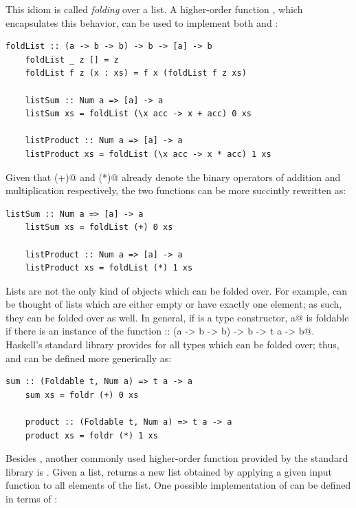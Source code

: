 \documentclass[UdineBachThesis,american,11pt]{PhdThesis}
\begin{document}
  This idiom is called \emph{folding} over a list. A higher-order function
  \lstinline@foldList@, which encapsulates this behavior, can be used to
  implement both \lstinline@listSum@ and \lstinline@listProduct@:

  \begin{lstlisting}[gobble=4,basicstyle=\ttfamily\small]
    foldList :: (a -> b -> b) -> b -> [a] -> b
    foldList _ z [] = z
    foldList f z (x : xs) = f x (foldList f z xs)

    listSum :: Num a => [a] -> a
    listSum xs = foldList (\x acc -> x + acc) 0 xs

    listProduct :: Num a => [a] -> a
    listProduct xs = foldList (\x acc -> x * acc) 1 xs
  \end{lstlisting}

  Given that \lstinline@(+)@ and \lstinline@(*)@ already denote the binary
  operators of addition and multiplication respectively, the two functions can
  be more succintly rewritten as:

  \begin{lstlisting}[gobble=4,basicstyle=\ttfamily\small]
    listSum :: Num a => [a] -> a
    listSum xs = foldList (+) 0 xs

    listProduct :: Num a => [a] -> a
    listProduct xs = foldList (*) 1 xs
  \end{lstlisting}

  Lists are not the only kind of objects which can be folded over. For example,
  \lstinline@Maybe@s can be thought of lists which are either empty or have
  exactly one element; as such, they can be folded over as well. In general, if
  \lstinline@t@ is a type constructor, \lstinline@t a@ is foldable if there is
  an instance of the function
  \lstinline@foldr :: (a -> b -> b) -> b -> t a -> b@. Haskell's standard
  library provides \lstinline@foldr@ for all types which can be folded over;
  thus, \lstinline@listSum@ and \lstinline@listProduct@ can be defined more
  generically as:

  \begin{lstlisting}[gobble=4,basicstyle=\ttfamily\small]
    sum :: (Foldable t, Num a) => t a -> a
    sum xs = foldr (+) 0 xs

    product :: (Foldable t, Num a) => t a -> a
    product xs = foldr (*) 1 xs
  \end{lstlisting}

  \pagebreak

  Besides \lstinline@foldr@, another commonly used higher-order function
  provided by the standard library is \lstinline@map@. Given a list,
  \lstinline@map@ returns a new list obtained by applying a given input function
  to all elements of the list. One possible implementation of \lstinline@map@
  can be defined in terms of \lstinline@foldr@:
\end{document}
